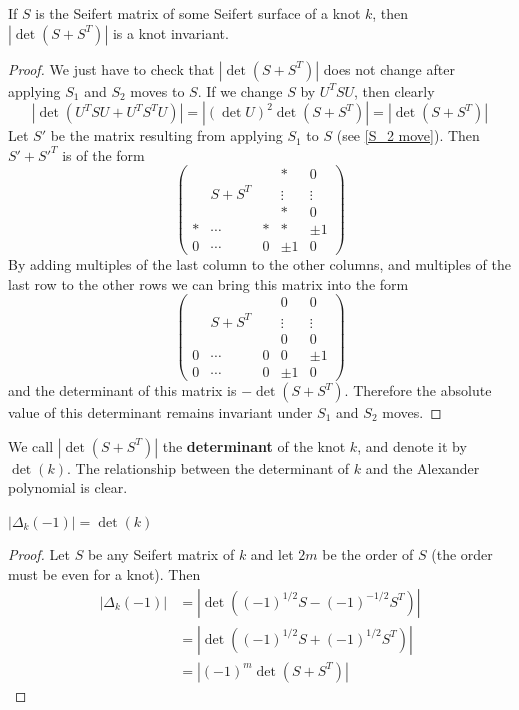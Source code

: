 \begin{prop}
\label{knot determinant}
If $S$ is the Seifert matrix of some Seifert surface of a knot $k$, then $|\det(S+S^T)|$ is a knot invariant.
\end{prop}
\begin{proof}
We just have to check that $|\det(S+S^T)|$ does not change after applying $S_1$ and $S_2$ moves to $S$. If we change $S$ by $U^TSU$, then clearly 
\[ |\det(U^TSU + U^TS^TU)| = |(\det U)^2 \det(S+S^T)| = |\det(S+S^T)| \]
Let $S'$ be the matrix resulting from applying $S_1$ to $S$ (see \eqref{S_2 move}). Then $S'+S'^T$ is of the form
\[ \begin{pmatrix}  & & & * & 0 \\ & S + S^T & & \vdots & \vdots \\ & & & * & 0 \\ * & \cdots & * & * & \pm 1 \\ 0 & \cdots & 0 & \pm 1 & 0 \end{pmatrix} \]
By adding multiples of the last column to the other columns, and multiples of the last row to the other rows we can bring this matrix into the form
\begin{equation}
\label{elementary transformations on S+S^T}
\begin{pmatrix}  & & & 0 & 0 \\ & S + S^T & & \vdots & \vdots \\ & & & 0 & 0 \\ 0 & \cdots & 0 & 0 & \pm 1 \\ 0 & \cdots & 0 & \pm 1 & 0 \end{pmatrix}
\end{equation}
and the determinant of this matrix is $-\det(S+S^T)$. Therefore the absolute value of this determinant remains invariant under $S_1$ and $S_2$ moves.
\end{proof}

We call $|\det(S+S^T)|$ the \textbf{determinant} of the knot $k$, and denote it by $\det(k)$. The relationship between the determinant of $k$ and the Alexander polynomial is clear.
\begin{prop}
$|\Delta_k(-1)| = \det(k)$
\end{prop}
\begin{proof}
Let $S$ be any Seifert matrix of $k$ and let $2m$ be the order of $S$ (the order must be even for a knot). Then
\begin{align*}
|\Delta_k(-1)| &= \left| \det\left( (-1)^{1/2} S - (-1)^{-1/2} S^T \right) \right| \\
               &= \left| \det\left( (-1)^{1/2} S + (-1)^{1/2} S^T \right) \right| \\
               &= \left| (-1)^m \det(S+S^T) \right|
\end{align*}
\end{proof}

